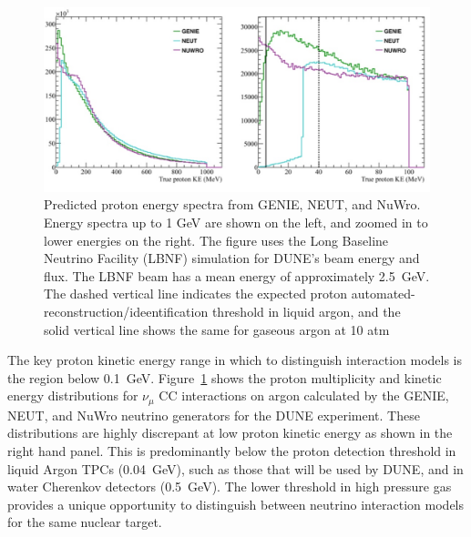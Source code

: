 \begin{figure}%
    \centering
    \includegraphics[width=12cm]{files/Figures/protons_from_argon.jpeg}%
    \caption{Predicted proton energy spectra from GENIE, NEUT, and NuWro\cite{Raaf:2018aaa}. Energy spectra up to 1 GeV are shown on the left, and zoomed in to lower energies on the right. The figure uses the Long Baseline Neutrino Facility (LBNF)  simulation for DUNE's beam energy and flux. The LBNF beam has a mean energy of approximately 2.5~GeV\cite{abi2020deep}. The dashed vertical line indicates the expected proton automated-reconstruction/ideentification threshold in liquid argon, and the solid vertical line shows the same for gaseous argon at 10 atm~\cite{dune2018high}}
    \label{fig:protonsfromargon}%
\end{figure}

The key proton kinetic energy range in which to distinguish interaction models is the region below 0.1~GeV.
Figure~\ref{fig:protonsfromargon} shows the proton multiplicity and kinetic energy distributions for $\nu_{\mu}$ CC interactions on argon calculated by the GENIE, NEUT, and NuWro neutrino generators for the DUNE experiment.
These distributions are highly discrepant at low proton kinetic energy as shown in the right hand panel.
This is predominantly below the proton detection threshold in liquid Argon TPCs (0.04~GeV), such as those that will be used by DUNE, and in water Cherenkov detectors (0.5~GeV).
The lower threshold in high pressure gas provides a unique opportunity to distinguish between neutrino interaction models for the same nuclear target.

